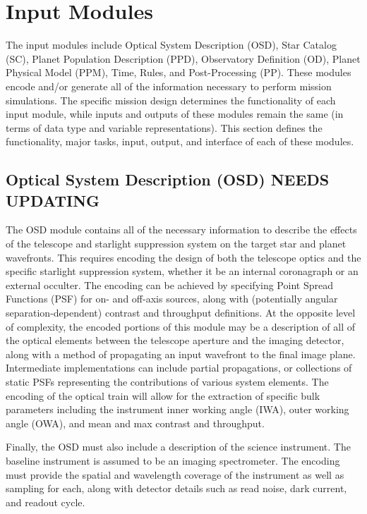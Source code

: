 \documentclass[cleanfoot]{asme2ej}
\begin{document}

\section{Input Modules}\label{sec:modules}
The input modules include Optical System Description (OSD), Star Catalog (SC), Planet Population Description (PPD), Observatory Definition (OD), Planet Physical Model (PPM), Time, Rules, and Post-Processing (PP).  These modules encode and/or generate all of the information necessary to perform mission simulations.  The specific mission design determines the functionality of each input module, while inputs and outputs of these modules remain the same (in terms of data type and variable representations).  This section defines the functionality, major tasks, input, output, and interface of each of these modules.


\subsection{Optical System Description (OSD) NEEDS UPDATING}
The OSD module contains all of the necessary information to describe the effects of the telescope and starlight suppression system on the target star and planet wavefronts.  This requires encoding the design of both the telescope optics and the specific starlight suppression system, whether it be an internal coronagraph or an external occulter.  The encoding can be achieved by specifying Point Spread Functions (PSF) for on- and off-axis sources, along with (potentially angular separation-dependent) contrast and throughput definitions.  At the opposite level of complexity, the encoded portions of this module may be a description of all of the optical elements between the telescope aperture and the imaging detector, along with a method of propagating an input wavefront to the final image plane.  Intermediate implementations can include partial propagations, or collections of static PSFs representing the contributions of various system elements.  The encoding of the optical train will allow for the extraction of specific bulk parameters including the instrument inner working angle (IWA), outer working angle (OWA), and mean and max contrast and throughput.

Finally, the OSD must also include a description of the science instrument.  The baseline instrument is assumed to be an imaging spectrometer.  The encoding must provide the spatial and wavelength coverage of the instrument as well as sampling for each, along with detector details such as read noise, dark current, and readout cycle.
\end{document}
